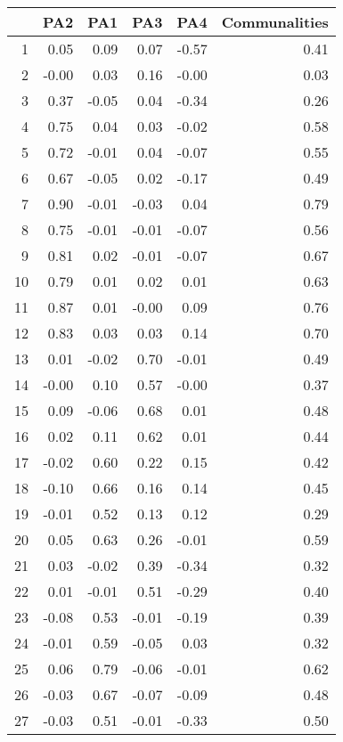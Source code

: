 \documentclass{article}
\begin{document}
\begin{table}[ht]
\centering
\begin{tabular}{rrrrrr}
  \hline
 & PA2 & PA1 & PA3 & PA4 & Communalities \\ 
  \hline
1 & 0.05 & 0.09 & 0.07 & -0.57 & 0.41 \\ 
  2 & -0.00 & 0.03 & 0.16 & -0.00 & 0.03 \\ 
  3 & 0.37 & -0.05 & 0.04 & -0.34 & 0.26 \\ 
  4 & 0.75 & 0.04 & 0.03 & -0.02 & 0.58 \\ 
  5 & 0.72 & -0.01 & 0.04 & -0.07 & 0.55 \\ 
  6 & 0.67 & -0.05 & 0.02 & -0.17 & 0.49 \\ 
  7 & 0.90 & -0.01 & -0.03 & 0.04 & 0.79 \\ 
  8 & 0.75 & -0.01 & -0.01 & -0.07 & 0.56 \\ 
  9 & 0.81 & 0.02 & -0.01 & -0.07 & 0.67 \\ 
  10 & 0.79 & 0.01 & 0.02 & 0.01 & 0.63 \\ 
  11 & 0.87 & 0.01 & -0.00 & 0.09 & 0.76 \\ 
  12 & 0.83 & 0.03 & 0.03 & 0.14 & 0.70 \\ 
  13 & 0.01 & -0.02 & 0.70 & -0.01 & 0.49 \\ 
  14 & -0.00 & 0.10 & 0.57 & -0.00 & 0.37 \\ 
  15 & 0.09 & -0.06 & 0.68 & 0.01 & 0.48 \\ 
  16 & 0.02 & 0.11 & 0.62 & 0.01 & 0.44 \\ 
  17 & -0.02 & 0.60 & 0.22 & 0.15 & 0.42 \\ 
  18 & -0.10 & 0.66 & 0.16 & 0.14 & 0.45 \\ 
  19 & -0.01 & 0.52 & 0.13 & 0.12 & 0.29 \\ 
  20 & 0.05 & 0.63 & 0.26 & -0.01 & 0.59 \\ 
  21 & 0.03 & -0.02 & 0.39 & -0.34 & 0.32 \\ 
  22 & 0.01 & -0.01 & 0.51 & -0.29 & 0.40 \\ 
  23 & -0.08 & 0.53 & -0.01 & -0.19 & 0.39 \\ 
  24 & -0.01 & 0.59 & -0.05 & 0.03 & 0.32 \\ 
  25 & 0.06 & 0.79 & -0.06 & -0.01 & 0.62 \\ 
  26 & -0.03 & 0.67 & -0.07 & -0.09 & 0.48 \\ 
  27 & -0.03 & 0.51 & -0.01 & -0.33 & 0.50 \\ 

\end{tabular}
\end{table}
\end{document}
